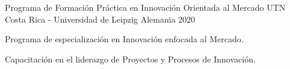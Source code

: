 \begin{cventries}
    {Programa de Formación Práctica en Innovación Orientada al
    Mercado} %
    {UTN Costa Rica - Universidad de Leipzig Alemania} %
    {2020} %
    {
      \begin{cvitems} %
        \item Programa de especialización en Innovación enfocada al
        Mercado.
        \item Capacitación en el liderazgo de Proyectos y Procesos de
        Innovación.
      \end{cvitems}
    }

\end{cventries}
